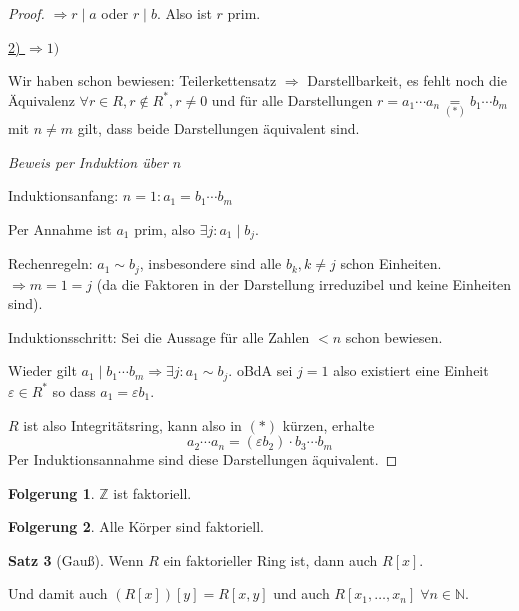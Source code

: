 \documentclass[12pt,parskip=full]{scrartcl}
\newcommand{\setN}{\mathbb{N}}
\newcommand{\setZ}{\mathbb{Z}}
\newcommand{\heading}{\underline}
\theoremstyle{definition}
\newtheorem{theorem}{Satz}[section]
\newtheorem{corollary}[theorem]{Folgerung}
\theoremstyle{remark}
\begin{document}
\begin{proof}
		$\Rightarrow r \mid a$ oder $r \mid b$. Also ist $r$ prim.
		
		\heading{2) $\Rightarrow 1)$}
		
		Wir haben schon bewiesen: Teilerkettensatz $\Rightarrow$ Darstellbarkeit, es fehlt noch die Äquivalenz $\forall r \in R, r \notin R^*, r \neq 0$ und für alle Darstellungen $r =  a_1 \cdots a_n \underset{(*)}{=} b_1 \cdots b_m$ mit $n \neq m$ gilt, dass beide Darstellungen äquivalent sind.
		
		\textit{Beweis per Induktion über $n$}
		
		Induktionsanfang: $n = 1: a_1 = b_1 \cdots b_m$
		
		Per Annahme ist $a_1$ prim, also $\exists j: a_1 \mid b_j$.
		
		Rechenregeln: $a_1 \sim b_j$, insbesondere sind alle $b_k, k \neq j$ schon Einheiten. $\Rightarrow m = 1 = j$ (da die Faktoren in der Darstellung irreduzibel und keine Einheiten sind).
		
		Induktionsschritt: Sei die Aussage für alle Zahlen $< n$ schon bewiesen.
		
		Wieder gilt $a_1 \mid b_1 \cdots b_m \Rightarrow \exists j: a_1 \sim b_j$. oBdA sei $j = 1$ also existiert eine Einheit $\varepsilon \in R^*$ so dass $a_1 = \varepsilon b_1$.
		
		$R$ ist also Integritätsring, kann also in $(*)$ kürzen, erhalte
		\begin{equation*}
			a_2 \cdots a_n = (\varepsilon b_2) \cdot b_3 \cdots b_m
		\end{equation*}
		Per Induktionsannahme sind diese Darstellungen äquivalent.
	\end{proof}

	\begin{corollary}
		$\setZ$ ist faktoriell.
	\end{corollary}

	\begin{corollary}
		Alle Körper sind faktoriell.
	\end{corollary}

	\begin{theorem}[Gauß]
		Wenn $R$ ein faktorieller Ring ist, dann auch $R[x]$.
		
		Und damit auch $(R[x])[y] = R[x,y]$ und auch $R[x_1, \dots, x_n] \; \forall n \in \setN$.
	\end{theorem}
\end{document}
